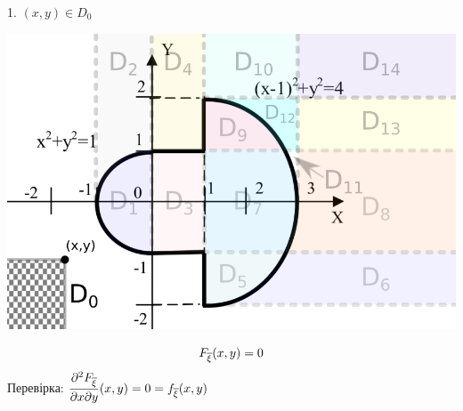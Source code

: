 \documentclass[14pt,a4paper]{scrartcl}
\theoremstyle{definition}
\theoremstyle{remark}
\theoremstyle{definition}
\theoremstyle{definition}
\begin{document}
1. $(x,y) \in D_0$
\begin{center} \includegraphics[scale=0.4]{assets/zone10.png} \end{center}
$$
F_{\overline{\xi}} (x,y) = 0
$$
Перевірка:
$\dfrac{\partial^2 F_{\overline{\xi}}}{\partial x \partial y}(x,y) = 0  = f_{\overline{\xi}} (x,y)$
\newpage
\end{document}
